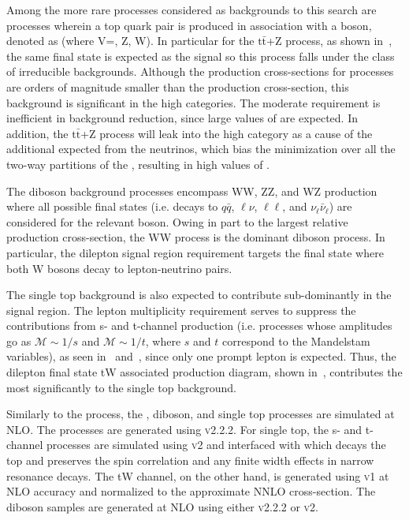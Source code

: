 Among the more rare processes considered as backgrounds to this search are processes wherein a top quark pair is produced in association with a boson, denoted as \ttV (where V=\gamma, Z, W). In particular for the $\mathrm{t\bar{t}}$+Z process, as shown in~, the same final state is expected as the signal so this process falls under the class of irreducible backgrounds. Although the production cross-sections for \ttV processes are orders of magnitude smaller than the \ttbar production cross-section, this background is significant in the high \mttll categories. The moderate \ptmiss requirement is inefficient in \ttV background reduction, since large values of \ptmiss are expected. In addition, the $\mathrm{t\bar{t}}$+Z process will leak into the high \mttll category as a cause of the additional expected \ptmiss from the neutrinos, which bias the minimization over all the two-way partitions of the \ptmiss, resulting in high values of \mttll.

The diboson background processes encompass WW, ZZ, and WZ production where all possible final states (i.e. decays to $q\bar{q}$, $\ell\nu$, $\ell\ell$, and $\nu_\ell\bar{\nu}_\ell$) are considered for the relevant boson. Owing in part to the largest relative production cross-section, the WW process is the dominant diboson process. In particular, the dilepton signal region requirement targets the final state where both W bosons decay to lepton-neutrino pairs. 
 
The single top background is also expected to contribute sub-dominantly in the signal region. The lepton multiplicity requirement serves to suppress the contributions from s- and t-channel production (i.e. processes whose amplitudes go as $\mathscr{M}\sim 1/s$ and $\mathscr{M}\sim 1/t$, where $s$ and $t$ correspond to the Mandelstam variables), as seen in~ and~, since only one prompt lepton is expected. Thus, the dilepton final state tW associated production diagram, shown in~, contributes the most significantly to the single top background.  

Similarly to the \ttll process, the \ttV, diboson, and single top processes are simulated at NLO. The \ttV processes are generated using \AMCATNLO \textsc{v2.2.2}. For single top, the s- and t-channel processes are simulated using \POWHEG \textsc{v2} and interfaced with \MadSpin which decays the top and preserves the spin correlation and any finite width effects in narrow resonance decays. The tW channel, on the other hand, is generated using \POWHEG \textsc{v1} at NLO accuracy and normalized to the approximate NNLO cross-section. The diboson samples are generated at NLO using either \AMCATNLO \textsc{v2.2.2} or \POWHEG \textsc{v2}.
 
